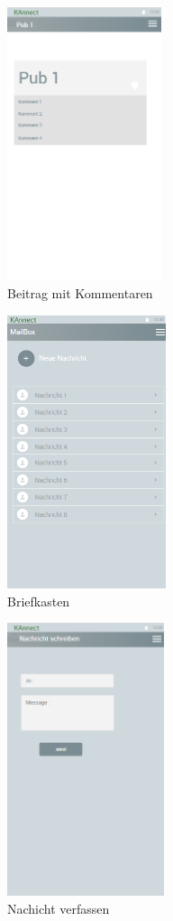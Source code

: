 \documentclass[parskip=full]{scrartcl}
\begin{document}
	
	
	\begin{figure}[H]
		\centering
		\includegraphics[height=8cm]{PubComments}
		\caption{Beitrag mit Kommentaren}
		\label{BeitragMitKommentaren}
	\end{figure}
	
	\begin{figure}[H]
		\centering
		\includegraphics[height=8cm]{Briefkasten}
		\caption{Briefkasten}
		\label{Briefkasten}
	\end{figure}
	
	\begin{figure}[H]
		\centering
		\includegraphics[height=8cm]{Message}
		\caption{Nachicht verfassen}
		\label{Nachricht}
	\end{figure}
	
\end{document}
